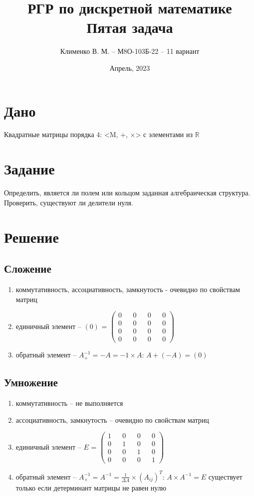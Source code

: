 \documentclass{article}
\title{РГР по дискретной математике\\Пятая задача}
\author{Клименко В. М. -- М8О-103Б-22 -- 11 вариант}
\date{Апрель, 2023}
\begin{document}
\maketitle


\section*{Дано}
Квадратные матрицы порядка 4: <M, +, $\times$> с элементами из $\mathbb{R}$


\section*{Задание}
Определить, является ли полем или кольцом заданная алгебраическая структура.
Проверить, существуют ли делители нуля.

\section*{Решение}
\subsection*{Сложение}
\begin{enumerate}
    \item коммутативность, ассоциативность, замкнутость - очевидно по свойствам матриц
    \item единичный элемент -- $(0)$ =
    $
    \begin{pmatrix}
        0 && 0 && 0 && 0 \\
        0 && 0 && 0 && 0 \\
        0 && 0 && 0 && 0 \\
        0 && 0 && 0 && 0
    \end{pmatrix}
    $
    \item обратный элемент -- $A^{-1}_+ = -A = -1 \times A$: $A + (-A) = (0)$
\end{enumerate}

\subsection*{Умножение}
\begin{enumerate}
    \item коммутативность -- не выполняется
    \item ассоциативность, замкнутость -- очевидно по свойствам матриц
    \item единичный элемент -- $E$ =
    $
    \begin{pmatrix}
        1 && 0 && 0 && 0 \\
        0 && 1 && 0 && 0 \\
        0 && 0 && 1 && 0 \\
        0 && 0 && 0 && 1
    \end{pmatrix}
    $
    \item обратный элемент -- 
    $A^{-1}_{\times} = A^{-1} = \frac{1}{\Delta A} \times (A_{ij})^T$:
    $A \times A^{-1} = E$ существует только если детерминант матрицы не равен нулю
\end{enumerate}
\end{document}
